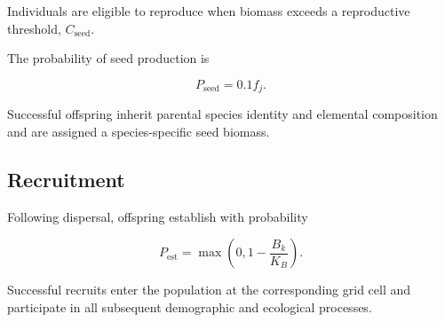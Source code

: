 Individuals are eligible to reproduce when biomass exceeds a reproductive threshold, $C_{\mathrm{seed}}$.

The probability of seed production is

\begin{equation}
P_{\mathrm{seed}}
=
0.1f_j.
\end{equation}

Successful offspring inherit parental species identity and elemental composition and are assigned a species-specific seed biomass.

\subsection{Recruitment}

Following dispersal, offspring establish with probability

\begin{equation}
P_{\mathrm{est}}
=
\max
\left(
0,
1-\frac{B_k}{K_B}
\right).
\end{equation}

Successful recruits enter the population at the corresponding grid cell and participate in all subsequent demographic and ecological processes.



